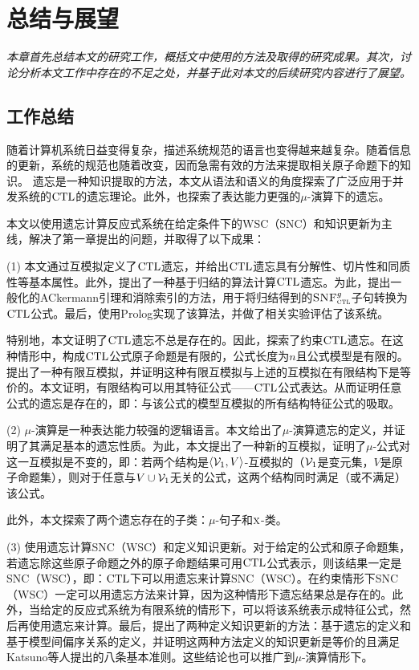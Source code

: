 \chapter{总结与展望}\label{chapter09}
{\em 本章首先总结本文的研究工作，概括文中使用的方法及取得的研究成果。其次，讨论分析本文工作中存在的不足之处，并基于此对本文的后续研究内容进行了展望。}

\section{工作总结}
随着计算机系统日益变得复杂，描述系统规范的语言也变得越来越复杂。随着信息的更新，系统的规范也随着改变，因而急需有效的方法来提取相关原子命题下的知识。
遗忘是一种知识提取的方法，本文从语法和语义的角度探索了广泛应用于并发系统的$\textrm{CTL}$的遗忘理论。此外，也探索了表达能力更强的$\mu$-演算下的遗忘。

本文以使用遗忘计算反应式系统在给定条件下的WSC（SNC）和知识更新为主线，解决了第一章提出的问题，并取得了以下成果：

(1) 本文通过互模拟定义了$\textrm{CTL}$遗忘，并给出$\textrm{CTL}$遗忘具有分解性、切片性和同质性等基本属性。此外，提出了一种基于归结的算法计算$\textrm{CTL}$遗忘。为此，提出一般化的ACkermann引理和消除索引的方法，用于将归结得到的${\textsc{SNF}_{\textsc{ctl}}^g}$子句转换为$\textrm{CTL}$公式。最后，使用Prolog实现了该算法，并做了相关实验评估了该系统。

特别地，本文证明了$\textrm{CTL}$遗忘不总是存在的。因此，探索了约束$\textrm{CTL}$遗忘。在这种情形中，构成$\textrm{CTL}$公式原子命题是有限的，公式长度为$n$且公式模型是有限的。提出了一种有限互模拟，并证明这种有限互模拟与上述的互模拟在有限结构下是等价的。本文证明，有限结构可以用其特征公式——$\textrm{CTL}$公式表达。从而证明任意公式的遗忘是存在的，即：与该公式的模型互模拟的所有结构特征公式的吸取。

(2) $\mu$-演算是一种表达能力较强的逻辑语言。本文给出了$\mu$-演算遗忘的定义，并证明了其满足基本的遗忘性质。为此，本文提出了一种新的互模拟，证明了$\mu$-公式对这一互模拟是不变的，即：若两个结构是${\langle{{\cal V}_1, V}\rangle}$-互模拟的（${\cal V}_1$是变元集，$V$是原子命题集），则对于任意与$V\cup {\cal V}_1$无关的公式，这两个结构同时满足（或不满足）该公式。

此外，本文探索了两个遗忘存在的子类：$\mu$-句子和$\textsc{x}$-类。

(3) 使用遗忘计算SNC（WSC）和定义知识更新。对于给定的公式和原子命题集，若遗忘除这些原子命题之外的原子命题结果可用$\textrm{CTL}$公式表示，则该结果一定是SNC（WSC），即：$\textrm{CTL}$下可以用遗忘来计算SNC（WSC）。在约束情形下SNC（WSC）一定可以用遗忘方法来计算，因为这种情形下遗忘结果总是存在的。此外，当给定的反应式系统为有限系统的情形下，可以将该系统表示成特征公式，然后再使用遗忘来计算。最后，提出了两种定义知识更新的方法：基于遗忘的定义和基于模型间偏序关系的定义，并证明这两种方法定义的知识更新是等价的且满足Katsuno等人提出的八条基本准则。这些结论也可以推广到$\mu$-演算情形下。

